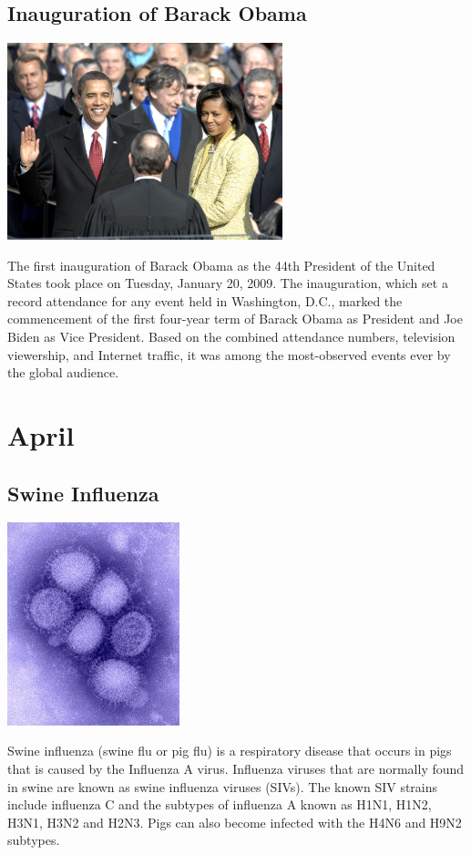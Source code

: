 \documentclass[11pt]{report}
\begin{document}
\subsection{Inauguration of Barack Obama}
\vspace{2mm}\begin{center}\includegraphics[width=8cm]{./img/obamaInaug.jpg}\end{center}
The first inauguration of Barack Obama as the 44th President of the United States took place on Tuesday, January 20, 2009. The inauguration, which set a record attendance for any event held in Washington, D.C., marked the commencement of the first four-year term of Barack Obama as President and Joe Biden as Vice President. Based on the combined attendance numbers, television viewership, and Internet traffic, it was among the most-observed events ever by the global audience.

\section{April}
\subsection{Swine Influenza}
\vspace{2mm}\begin{center}\includegraphics[width=5cm]{./img/h1N1.jpg}\end{center}
Swine influenza (swine flu or pig flu) is a respiratory disease that occurs in pigs that is caused by the Influenza A virus. Influenza viruses that are normally found in swine are known as swine influenza viruses (SIVs). The known SIV strains include influenza C and the subtypes of influenza A known as H1N1, H1N2, H3N1, H3N2 and H2N3. Pigs can also become infected with the H4N6 and H9N2 subtypes.
\end{document}
